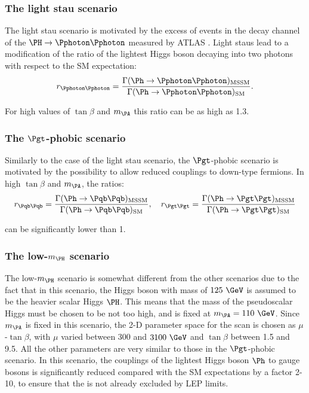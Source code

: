 \subsubsection{The light stau scenario}
\label{sec:lightstauscenario}

The light stau scenario is motivated by the excess of events in the decay
channel of the $\PH\to\Pphoton\Pphoton$ measured by ATLAS
\cite{ATLAS-CONF-2013-012}. Light staus
lead to a modification of the ratio of the lightest Higgs boson decaying into
two photons with respect to the \ac{SM} expectation:
\begin{equation}
r_{\Pphoton\Pphoton} =
\frac{\Gamma(\Ph\to\Pphoton\Pphoton)_{\text{MSSM}}}{\Gamma(\Ph\to\Pphoton\Pphoton)_{\text{SM}}}
.
\end{equation}

For high values of $\tan\beta$ and $m_{\PA}$ this ratio can be as high as 1.3. 

\subsubsection{The $\Pgt$-phobic scenario}
\label{sec:tauphobicscenario}

Similarly to the case of the light stau scenario, the $\Pgt$-phobic scenario is
motivated by the possibility to allow reduced couplings to down-type fermions.
In high $\tan\beta$ and $m_{\PA}$, the ratios:
\begin{equation}
r_{\Pqb\Pqb} =
\frac{\Gamma(\Ph\to\Pqb\Pqb)_{\text{MSSM}}}{\Gamma(\Ph\to\Pqb\Pqb)_{\text{SM}}}
, \quad
r_{\Pgt\Pgt} =
\frac{\Gamma(\Ph\to\Pgt\Pgt)_{\text{MSSM}}}{\Gamma(\Ph\to\Pgt\Pgt)_{\text{SM}}}
\end{equation}

can be significantly lower than 1.

\subsubsection{The low-$m_{\PH}$ scenario}
\label{sec:lowmHscenario}

The low-$m_{\PH}$ scenario is somewhat different from the other scenarios due to
the fact that in this scenario, the Higgs boson with mass of $125~\GeV$ is
assumed to be the heavier scalar Higgs $\PH$. This means that the mass of the
pseudoscalar Higgs must be chosen to be not too high, and is fixed at $m_{\PA} =
110~\GeV$. Since $m_{\PA}$ is fixed in this scenario, the 2-D parameter space
for the scan is chosen as $\mu$-$\tan\beta$, with $\mu$ varied between 300 and
$3100~\GeV$ and $\tan\beta$ between 1.5 and 9.5. All the other parameters are
very similar to those in the $\Pgt$-phobic scenario. In this scenario, the
couplings of the lightest Higgs boson $\Ph$ to gauge bosons is significantly
reduced compared with the \ac{SM} expectations by a factor 2-10, to ensure that
the \Ph is not already excluded by LEP limits. 

